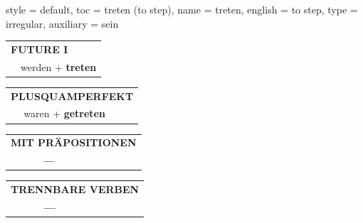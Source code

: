 \begin{verbentry}{
  style = {default},
  toc = {treten (to step)},
  name = {treten},
  english = {to step},
  type = {irregular},
  auxiliary = {sein}
}
\begin{tabular}{rl}
    \multicolumn{2}{l}{\textbf{FUTURE I} }\\
   & werden + \textbf{treten}\\
 
  \end{tabular}
\hfill
   \begin{tabular}{rl}
      \multicolumn{2}{l}{\textbf{PLUSQUAMPERFEKT}}\\
   & waren + \textbf{getreten}\\
  \end{tabular}
  
  \vspace{10pt}



\begin{tabular}{lll}
\multicolumn{3}{l}{\textbf{MIT PRÄPOSITIONEN}}\\
& \textbf{---} & \\
\end{tabular}
\hfill
\begin{tabular}{lll}
\multicolumn{3}{l}{\textbf{TRENNBARE VERBEN}}\\
& \textbf{---} & \\
\end{tabular}

  \vspace{-5pt}
\end{verbentry}

